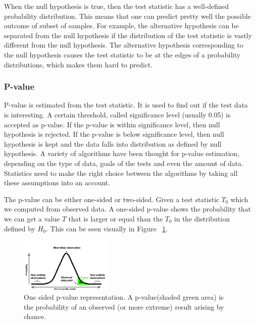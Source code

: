 \documentclass[12pt]{article}
\begin{document}
{When the null hypothesis is true, then the test statistic has a well-defined probability distribution. This means that one can predict pretty well the possible outcome of subset of samples. For example, the alternative hypothesis can be separated from the null hypothesis if the distribution of the test statistic is vastly different from the null hypothesis. The alternative hypothesis corresponding to the null hypothesis causes the test statistic to be at the edges of a probability distributions, which makes them hard to predict.

\subsubsection{P-value}
P-value is estimated from the test statistic. It is used to find out if the test data is interesting. A certain threshold, called significance level (usually 0.05) is accepted as p-value. If the p-value is within significance level, then null hypothesis is rejected. If the p-value is below significance level, then null hypothesis is kept and the data falls into distribution as defined by null hypothesis. A variety of algorithms have been thought for p-value estimation, depending on the type of data, goals of the tests and even the amount of data. Statistics need to make the right choice between the algorithms by taking all these assumptions into an account.

The p-value can be either one-sided or two-sided. Given a test statistic $T_0$ which we computed from observed data. A one-sided p-value shows the probability that we can get a value $T$ that is larger or equal than the $T_0$ in the distribution defined by $H_0$. This can be seen visually in Figure ~\ref{fig:p_value_one_sided}.

\begin{figure}[H]
  \centering
  \includegraphics[width=0.4\textwidth]{p_value_one_sided}
  \caption{One sided p-value representation. A p-value(shaded green area) is the probability of an observed (or more extreme) result arising by chance. ~\cite{p_value_pic_cite}}
  \label{fig:p_value_one_sided}
\end{figure}

}
\end{document}
